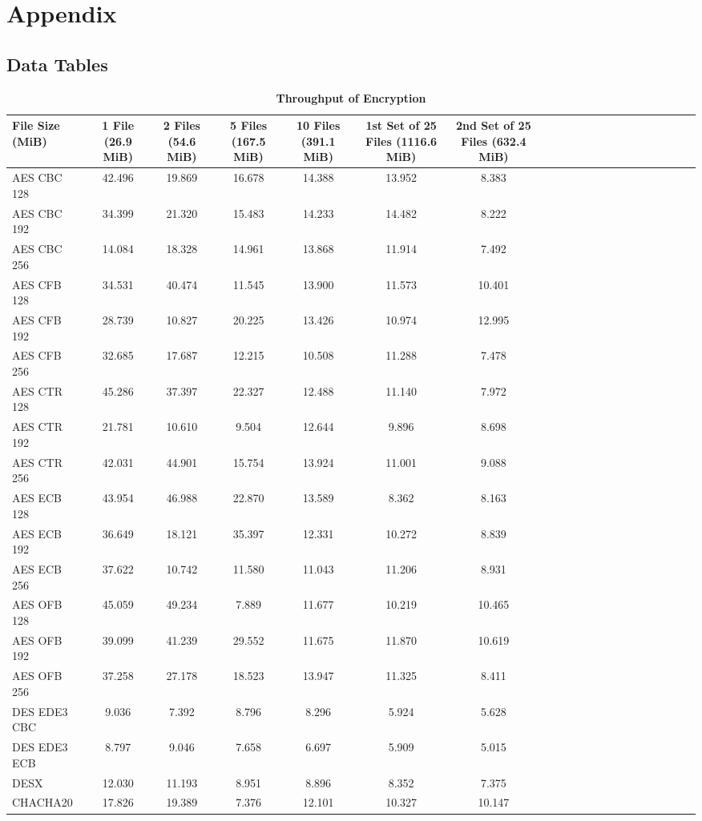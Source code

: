 \documentclass[conference]{IEEEtran}
\begin{document}
\section*{Appendix}
\subsection{Data Tables}
\FloatBarrier
\begin{table}[htbp]
	\begin{center}
		\caption{\textbf{Throughput of Encryption}}
		\begin{tabularx}{\textwidth}{@{}l*{19}{C}c@{}}
			\hline
			\toprule
			File Size (MiB) & 1 File (26.9 MiB) & 2 Files (54.6 MiB) & 5 Files (167.5 MiB) & 10 Files (391.1 MiB) & 1st Set of 25 Files (1116.6 MiB) & 2nd Set of 25 Files (632.4 MiB) \\
			
			\midrule
			AES CBC 128  & 42.496 & 19.869 & 16.678 & 14.388 & 13.952 & 8.383 \\
			AES CBC 192  & 34.399 & 21.320 & 15.483 & 14.233 & 14.482 & 8.222 \\
			AES CBC 256  & 14.084 & 18.328 & 14.961 & 13.868 & 11.914 & 7.492 \\
			AES CFB 128  & 34.531 & 40.474 & 11.545 & 13.900 & 11.573 & 10.401\\
			AES CFB 192  & 28.739 & 10.827 & 20.225 & 13.426 & 10.974 & 12.995\\
			AES CFB 256  & 32.685 & 17.687 & 12.215 & 10.508 & 11.288 & 7.478 \\
			\addlinespace
			AES CTR 128  & 45.286 & 37.397 & 22.327 & 12.488 & 11.140 & 7.972 \\
			AES CTR 192  & 21.781 & 10.610 & 9.504  & 12.644 & 9.896  & 8.698 \\
			AES CTR 256  & 42.031 & 44.901 & 15.754 & 13.924 & 11.001 & 9.088 \\
			AES ECB 128  & 43.954 & 46.988 & 22.870 & 13.589 & 8.362  & 8.163 \\
			AES ECB 192  & 36.649 & 18.121 & 35.397 & 12.331 & 10.272 & 8.839 \\
			AES ECB 256  & 37.622 & 10.742 & 11.580 & 11.043 & 11.206 & 8.931 \\
			\addlinespace
			AES OFB 128  & 45.059 & 49.234 & 7.889  & 11.677 & 10.219 & 10.465\\
			AES OFB 192  & 39.099 & 41.239 & 29.552 & 11.675 & 11.870 & 10.619\\
			AES OFB 256  & 37.258 & 27.178 & 18.523 & 13.947 & 11.325 & 8.411 \\
			\addlinespace
			DES EDE3 CBC & 9.036  & 7.392  & 8.796  & 8.296  & 5.924  & 5.628 \\
			DES EDE3 ECB & 8.797  & 9.046  & 7.658  & 6.697  & 5.909  & 5.015 \\
			DESX         & 12.030 & 11.193 & 8.951  & 8.896  & 8.352  & 7.375 \\
			CHACHA20     & 17.826 & 19.389 & 7.376  & 12.101 & 10.327 & 10.147\\
			

\end{tabularx}
\end{center}
\end{table}
\end{document}
